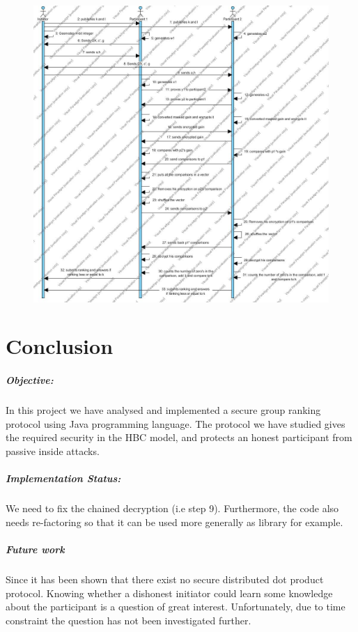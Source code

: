 \documentclass[11pt, a4paper, oneside, openright]{book} %
\begin{document}
\begin{figure}
	\centering					
	\includegraphics[width=\paperwidth]{Initator}
	\centering
\end{figure}

\chapter{Conclusion}

\paragraph{Objective:}
In this project we have analysed and implemented a secure group ranking protocol using Java programming language. 
The protocol we have studied gives the required security in the HBC model, and protects an honest participant from passive inside attacks.

\paragraph{Implementation Status:}
We need to fix the chained decryption (i.e step 9).
Furthermore, the code also needs re-factoring so that it can be used more generally as library for example. 
\paragraph{Future work}
Since it has been shown that there exist no secure distributed dot product protocol\cite{imp}. Knowing whether a dishonest initiator could learn some knowledge about the participant is a question of great interest. Unfortunately, due to time constraint the question has not  been investigated further.
\end{document}
